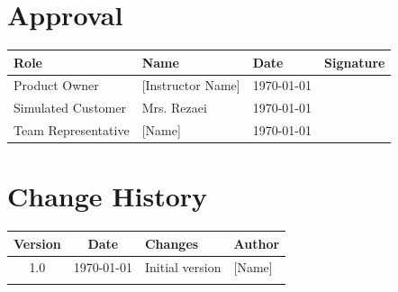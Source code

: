 \documentclass[12pt, a4paper]{article}
\begin{document}
\section{Approval}

\begin{center}
\begin{tabular}{|l|l|l|l|}
\hline
\textbf{Role} & \textbf{Name} & \textbf{Date} & \textbf{Signature} \\
\hline
Product Owner & [Instructor Name] & \today & \\
\hline
Simulated Customer & Mrs. Rezaei & \today & \\
\hline
Team Representative & [Name] & \today & \\
\hline
\end{tabular}
\end{center}

\appendix
\section{Change History}

\begin{center}
\begin{tabular}{|c|c|l|l|}
\hline
\textbf{Version} & \textbf{Date} & \textbf{Changes} & \textbf{Author} \\
\hline
1.0 & \today & Initial version & [Name] \\
\hline
 & & & \\
\hline
\end{tabular}
\end{center}
\end{document}
